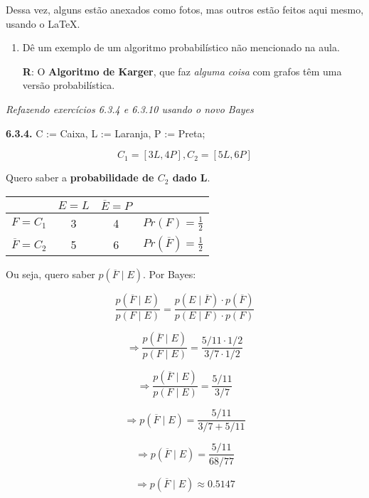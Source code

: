 \documentclass{article}
\begin{document}
Dessa vez, alguns estão anexados como fotos, mas outros estão feitos aqui mesmo, usando o \LaTeX.

\begin{enumerate}

    \item  Dê um exemplo de um algoritmo probabilístico não mencionado na aula.

        \textbf{R}: O \textbf{Algoritmo de Karger}, que faz \textit{alguma coisa} com grafos têm uma versão probabilística.

\end{enumerate}

\begin{center}
    \textit{Refazendo exercícios 6.3.4 e 6.3.10 usando o novo Bayes} 
\end{center}

\textbf{6.3.4.} C := Caixa, L := Laranja, P := Preta;

\[ C_1 = [3L, 4P], C_2 = [5L, 6P] \]

Quero saber a \textbf{probabilidade de \( C_2 \) dado L}.

\begin{center}
    \begin{tabular}{c | c  c | c} 
        & \(E = L\) & \( \overline{E} = P\) & \\ [0.5ex]
        \hline
        \( F = C_1 \) & 3 & 4 & \( Pr(F) = \frac{1}{2} \)  \\ [0.8ex]
        \hline
        \( \overline{F} = C_2 \) & 5 & 6 & \( Pr(\overline{F}) = \frac{1}{2} \) \\ [0.8ex]
    \end{tabular}
\end{center}

Ou seja, quero saber \( p(\overline{F} \mid E) \). Por Bayes:

\[ \frac{p(\overline{F} \mid E)}{p(F \mid E)} = \frac{p (E \mid \overline{F}) \cdot p(\overline{F} )}{p (E \mid {F}) \cdot p({F})} \] 


\[ \Rightarrow \frac{p(\overline{F} \mid E)}{p(F \mid E)} = \frac{5/11 \cdot 1/2}{3/7 \cdot 1/2} \] 

\[ \Rightarrow \frac{p(\overline{F} \mid E)}{p(F \mid E)} = \frac{5/11}{3/7} \]

\[ \Rightarrow {p(\overline{F} \mid E)} = \frac{5/11}{3/7 + 5/11} \]

\[ \Rightarrow {p(\overline{F} \mid E)} = \frac{5/11}{68/77} \]

\[ \Rightarrow {p(\overline{F} \mid E)} \approx 0.5147 \]
\end{document}
